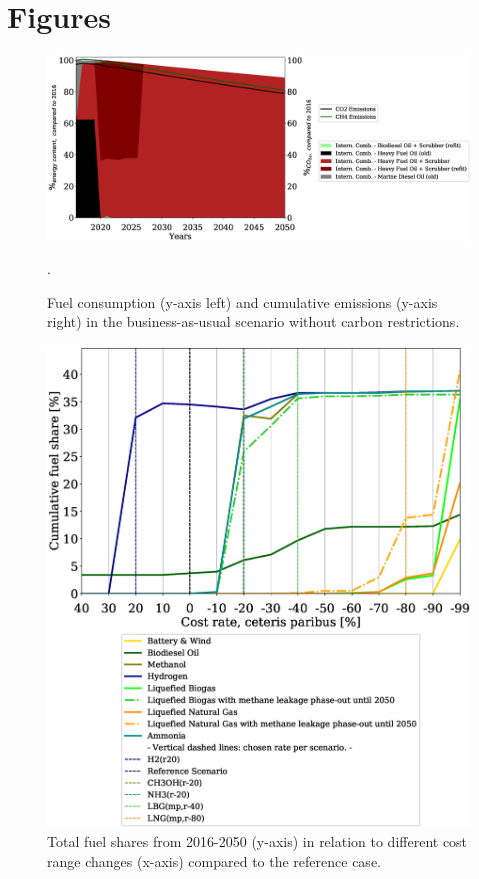 \documentclass[article]{elsarticle}
\begin{document}
\newpage
\section{Figures}
\begin{figure}[h]
    \centering
    \includegraphics[width=\textwidth]{figures/BAU_fuels_emissions.eps}
    \caption{Fuel consumption (y-axis left) and cumulative emissions (y-axis right) in the business-as-usual scenario without carbon restrictions.}
    \label{fig:BAU}.
\end{figure}
\begin{figure}[h]
    \centering
    \includegraphics[width=.825\textwidth]{figures/costVariation.eps}
    \caption{Total fuel shares from 2016-2050 (y-axis) in relation to different cost range changes (x-axis) compared to the reference case.}
    \label{fig:costVariation}
\end{figure}
\end{document}

